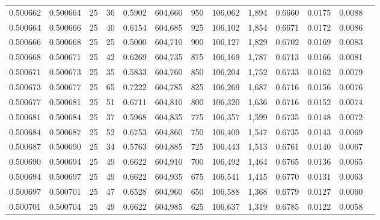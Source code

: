 \begin{tabular}{rrrrrrrrrrrrr}
0.500662 & 0.500664 &    25 &  36 &                                     0.5902 & 604,660 &     950 & 106,062 &   1,894 & 0.6660 & 0.0175 & 0.0088 \\
0.500664 & 0.500666 &    25 &  40 &                                     0.6154 & 604,685 &     925 & 106,102 &   1,854 & 0.6671 & 0.0172 & 0.0086 \\
0.500666 & 0.500668 &    25 &  25 &                                     0.5000 & 604,710 &     900 & 106,127 &   1,829 & 0.6702 & 0.0169 & 0.0083 \\
0.500668 & 0.500671 &    25 &  42 &                                     0.6269 & 604,735 &     875 & 106,169 &   1,787 & 0.6713 & 0.0166 & 0.0081 \\
0.500671 & 0.500673 &    25 &  35 &                                     0.5833 & 604,760 &     850 & 106,204 &   1,752 & 0.6733 & 0.0162 & 0.0079 \\
0.500673 & 0.500677 &    25 &  65 &                                     0.7222 & 604,785 &     825 & 106,269 &   1,687 & 0.6716 & 0.0156 & 0.0076 \\
0.500677 & 0.500681 &    25 &  51 &                                     0.6711 & 604,810 &     800 & 106,320 &   1,636 & 0.6716 & 0.0152 & 0.0074 \\
0.500681 & 0.500684 &    25 &  37 &                                     0.5968 & 604,835 &     775 & 106,357 &   1,599 & 0.6735 & 0.0148 & 0.0072 \\
0.500684 & 0.500687 &    25 &  52 &                                     0.6753 & 604,860 &     750 & 106,409 &   1,547 & 0.6735 & 0.0143 & 0.0069 \\
0.500687 & 0.500690 &    25 &  34 &                                     0.5763 & 604,885 &     725 & 106,443 &   1,513 & 0.6761 & 0.0140 & 0.0067 \\
0.500690 & 0.500694 &    25 &  49 &                                     0.6622 & 604,910 &     700 & 106,492 &   1,464 & 0.6765 & 0.0136 & 0.0065 \\
0.500694 & 0.500697 &    25 &  49 &                                     0.6622 & 604,935 &     675 & 106,541 &   1,415 & 0.6770 & 0.0131 & 0.0063 \\
0.500697 & 0.500701 &    25 &  47 &                                     0.6528 & 604,960 &     650 & 106,588 &   1,368 & 0.6779 & 0.0127 & 0.0060 \\
0.500701 & 0.500704 &    25 &  49 &                                     0.6622 & 604,985 &     625 & 106,637 &   1,319 & 0.6785 & 0.0122 & 0.0058 \\

\end{tabular}
